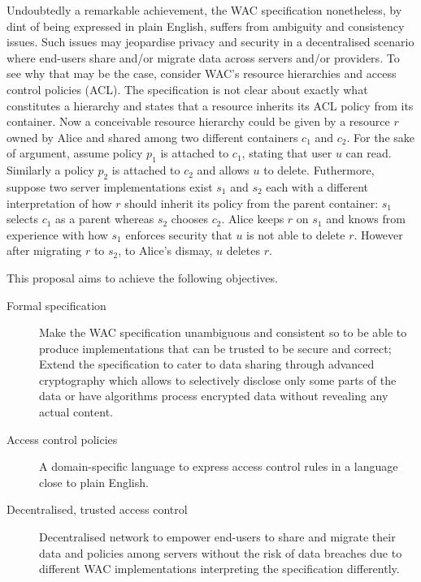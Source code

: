 Undoubtedly a remarkable achievement, the WAC specification nonetheless,
by dint of being expressed in plain English, suffers from ambiguity
and consistency issues. Such issues may jeopardise privacy and security
in a decentralised scenario where end-users share and/or migrate data
across servers and/or providers. To see why that may be the case,
consider WAC's resource hierarchies and access control policies (ACL).
The specification is not clear about exactly what constitutes a hierarchy
and states that a resource inherits its ACL policy from its container.
Now a conceivable resource hierarchy could be given by a resource $r$
owned by Alice and shared among two different containers $c_1$ and
$c_2$. For the sake of argument, assume policy $p_1$ is attached to
$c_1$, stating that user $u$ can read. Similarly a policy $p_2$ is
attached to $c_2$ and allows $u$ to delete. Futhermore, suppose two
server implementations exist $s_1$ and $s_2$ each with a different
interpretation of how $r$ should inherit its policy from the parent
container: $s_1$ selects $c_1$ as a parent whereas $s_2$ chooses $c_2$.
Alice keeps $r$ on $s_1$ and knows from experience with how $s_1$
enforces security that $u$ is not able to delete $r$. However after
migrating $r$ to $s_2$, to Alice's dismay, $u$ deletes $r$.

This proposal aims to achieve the following objectives.
\begin{description}
  \item[Formal specification] Make the WAC specification unambiguous
    and consistent so to be able to produce implementations that can
    be trusted to be secure and correct; Extend the specification to
    cater to data sharing through advanced cryptography which allows
    to selectively disclose only some parts of the data or have algorithms
    process encrypted data without revealing any actual content.
  \item[Access control policies] A domain-specific language to express
    access control rules in a language close to plain English.
  \item[Decentralised, trusted access control] Decentralised network
    to empower end-users to share and migrate their data and policies
    among servers without the risk of data breaches due to different
    WAC implementations interpreting the specification differently.
\end{description}
